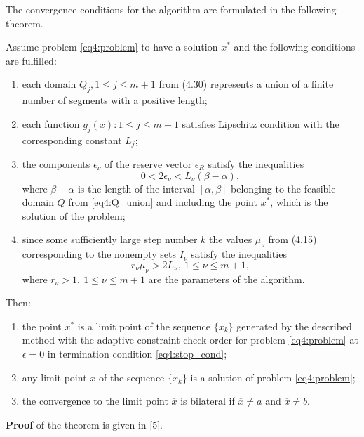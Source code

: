 \documentclass[graybox]{svmult}
\begin{document}
The convergence conditions for the algorithm are formulated in the following theorem.

\begin{theorem}
Assume problem \eqref{eq4:problem} to have a solution $x^*$ and the following conditions are fulfilled:
\begin{enumerate}
  \item each domain $Q_j ,1\le j\le m+1$ from (4.30) represents a union of a finite number of segments with a positive length;
  \item each function $g_j(x): 1\le j\le m+1$ satisfies Lipschitz condition with the corresponding constant $L_j$;
  \item the components $\epsilon_\nu$ of the reserve vector $\epsilon_R$ satisfy the inequalities
  \begin{equation}
    0<2\epsilon_\nu<L_\nu(\beta-\alpha),
  \end{equation}
  where $\beta-\alpha$ is the length of the interval $[\alpha,\beta]$ belonging to the feasible domain $Q$ from \eqref{eq4:Q_union} and including the point $x^*$, which is the solution of the problem;
  \item since some sufficiently large step number $k$ the values $\mu_\nu$ from (4.15) corresponding to the nonempty sets $I_\nu$ satisfy the inequalities
  \begin{displaymath}
    r_\nu\mu_\nu>2L_\nu,\: 1\le\nu\le m+1,
  \end{displaymath}
  where $r_\nu>1,\: 1\le\nu\le m+1$ are the parameters of the algorithm.
\end{enumerate}

  Then:
  \begin{enumerate}
    \item the point $x^*$ is a limit point of the sequence $\{x_k\}$ generated by the described method with the adaptive constraint check order for problem \eqref{eq4:problem} at $\epsilon=0$ in termination condition \eqref{eq4:stop_cond};
    \item any limit point $x$ of the sequence $\{x_k\}$ is a solution of problem \eqref{eq4:problem};
    \item the convergence to the limit point $\overline x$ is bilateral if $\overline x\not= a$ and $\overline x\not=b$.
  \end{enumerate}
\end{theorem}

\textbf{Proof} of the theorem is given in \cite{}[5].
\end{document}
